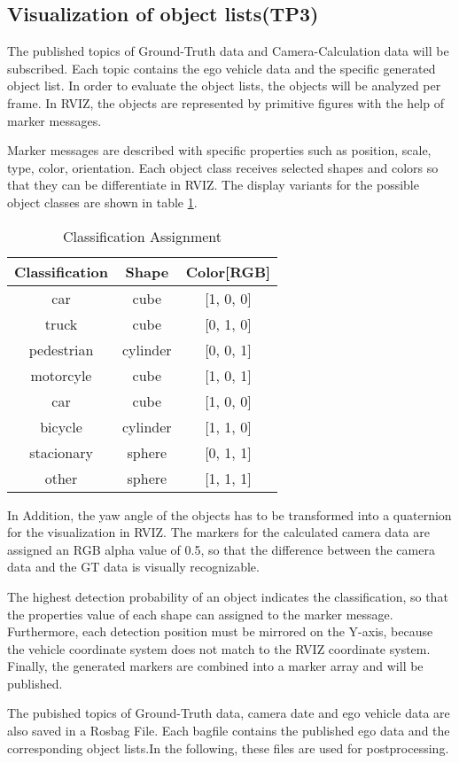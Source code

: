 \subsection{Visualization of object lists(TP3)}




The published topics of Ground-Truth data and Camera-Calculation data will be subscribed. Each topic contains the ego vehicle data and the specific generated object list. In order to evaluate the object lists, the objects will be analyzed per frame. In RVIZ, the objects are represented by primitive figures with the help of marker messages.



Marker messages are described with specific properties such as position, scale, type, color, orientation. Each object class receives selected shapes and colors so that they can be differentiate in RVIZ. The display variants for the possible object classes are shown in table \ref{ClassificationAssignment}. 

\begin{table}[h]
\caption{Classification Assignment}
\label{ClassificationAssignment}
\begin{center}
\begin{tabular}{c c c}
\hline
Classification & Shape & Color[RGB]\\
\hline
car & cube & [1, 0, 0]\\
truck & cube & [0, 1, 0]\\
pedestrian & cylinder & [0, 0, 1]\\
motorcyle & cube & [1, 0, 1]\\
car & cube & [1, 0, 0]\\
bicycle & cylinder & [1, 1, 0]\\
stacionary & sphere & [0, 1, 1]\\
other & sphere & [1, 1, 1]\\
\hline


\end{tabular}
\end{center}
\end{table}

In Addition, the yaw angle of the objects has to be transformed into a quaternion for the visualization in RVIZ. The markers for the calculated camera data are assigned an RGB alpha value of 0.5, so that the difference between the camera data and the GT data is visually recognizable. 




The highest detection probability of an object indicates the classification, so that the properties value of each shape can assigned to the marker message. Furthermore, each detection position must be mirrored on the Y-axis, because the vehicle coordinate system does not match to the RVIZ coordinate system. Finally, the generated markers are combined into a marker array and will be published.

The pubished topics of Ground-Truth data, camera date and ego vehicle data are also saved in a Rosbag File. Each bagfile contains the published ego data and the corresponding object lists.In the following, these files are used for postprocessing.